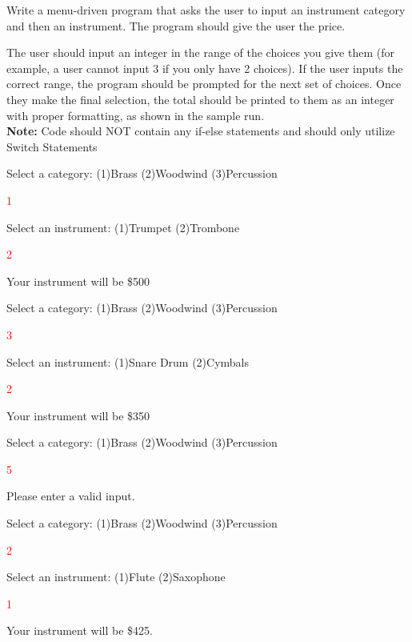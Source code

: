 Write a menu-driven program that asks the user to input an instrument category and then an instrument. The program should give the user the price.

The user should input an integer in the range of the choices you give them (for example, a user cannot input 3 if you only have 2 choices). If the user inputs the correct range, the program should be prompted for the next set of choices. Once they make the final selection, the total should be printed to them as an integer with proper formatting, as shown in the sample run. \\

\textbf{Note:} Code should NOT contain any  if-else statements and should only utilize Switch Statements


\begin{sample}
Select a category: (1)Brass (2)Woodwind (3)Percussion

 \textcolor{red}{1}
 
Select an instrument: (1)Trumpet (2)Trombone

 \textcolor{red}{2}
 
Your instrument will be \$500

\end{sample}

\begin{sample}
Select a category: (1)Brass (2)Woodwind (3)Percussion

 \textcolor{red}{3}
 
Select an instrument: (1)Snare Drum (2)Cymbals

 \textcolor{red}{2}
 
Your instrument will be \$350

\end{sample}

\begin{sample}
Select a category: (1)Brass (2)Woodwind (3)Percussion

 \textcolor{red}{5}
 
Please enter a valid input.

\end{sample}
\begin{sample}
Select a category: (1)Brass (2)Woodwind (3)Percussion

 \textcolor{red}{2}
 
 
Select an instrument: (1)Flute (2)Saxophone

 \textcolor{red}{1}
 
Your instrument will be \$425.


\end{sample}

